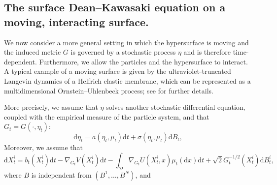\documentclass[11pt, a4paper]{article}
\newcommand{\cdummy}{\cdot}
\newcommand{\mathd}{\mathrm{d}}
\begin{document}
\subsection{The surface Dean--Kawasaki equation on a moving, interacting surface.}

We now consider a more general setting in which the hypersurface is moving and the induced metric $G$ is governed by a stochastic process
$\eta$ and is therefore time-dependent.
 Furthermore, we allow the particles and the hypersurface to interact. A typical example of a moving surface is given by the ultraviolet-truncated Langevin dynamics of a Helfrich elastic membrane, which can be represented as a multidimensional Ornstein--Uhlenbeck process; see \cite[Section 4]{DuncanElliottPavliotisStuart}
for further details.

 More precisely,  we assume that $\eta$ solves another stochastic differential equation,
coupled with the empirical measure of the particle system, and that $G_t = G (\cdummy, \eta_t)$:
\begin{equation}\label{eq:eta}
    \mathd \eta_t = a (\eta_t, \mu_t) \mathd t + \sigma (\eta_t, \mu_t)
   \mathd B_t,
\end{equation}
 Moreover, we assume
that
\[
    \mathd X^i_t = b_t (X^i_t) \mathd t - \nabla_{G_{t}} V (X^i_t)
   \mathd t - \int_\mathcal{D} \nabla_{G_{t}} U (X^i_t, x) \mu_t (\mathd x) \mathd
   t + \sqrt{2} G^{- 1 / 2}_{t} (X_t^i) \mathd B^i_t,
\]
where $B$ is independent from $(B^1, \ldots, B^N)$, and
\end{document}

